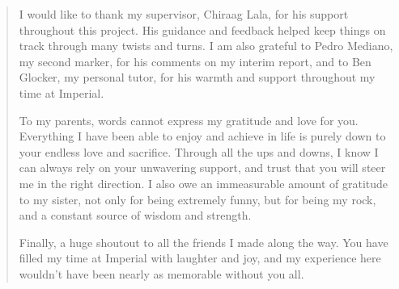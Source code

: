 \renewcommand{\abstractname}{Acknowledgements}
\begin{abstract}
I would like to thank my supervisor, Chiraag Lala, for his support throughout this project. His guidance and feedback helped keep things on track through many twists and turns. I am also grateful to Pedro Mediano, my second marker, for his comments on my interim report, and to Ben Glocker, my personal tutor, for his warmth and support throughout my time at Imperial.

To my parents, words cannot express my gratitude and love for you. Everything I have been able to enjoy and achieve in life is purely down to your endless love and sacrifice. Through all the ups and downs, I know I can always rely on your unwavering support, and trust that you will steer me in the right direction. I also owe an immeasurable amount of gratitude to my sister, not only for being extremely funny, but for being my rock, and a constant source of wisdom and strength.

Finally, a huge shoutout to all the friends I made along the way. You have filled my time at Imperial with laughter and joy, and my experience here wouldn't have been nearly as memorable without you all.    
\end{abstract}
\renewcommand{\abstractname}{Abstract}
